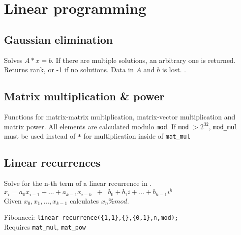 \section{Linear programming}

\subsection{Gaussian elimination}
Solves $A * x = b$. If there are multiple solutions, an arbitrary one is returned. Returns rank, or -1 if no solutions. Data in $A$ and $b$ is lost. .


\subsection{Matrix multiplication \& power}
Functions for matrix-matrix multiplication, matrix-vector multiplication and matrix power. All elements are calculated modulo \verb|mod|. If \verb|mod| $> 2^{32}$, \verb|mod_mul| must be used instead of \verb|*| for multiplication inside of \verb|mat_mul|


\subsection{Linear recurrences}
Solve for the n-th term of a linear recurrence in .\\
$x_i = a_0 x_{i-1} + ... + a_{k-1} x_{i-k} \;\; + \;\; b_0 + b_1 i + ... + b_{h-1} i^h$ \\
Given $x_0, x_1, ..., x_{k-1}$ calculates $x_n \% mod$.

Fibonacci: \texttt{linear\_recurrence(\{1,1\},\{\},\{0,1\},n,mod);}\\
Requires \verb|mat_mul|, \verb|mat_pow|

